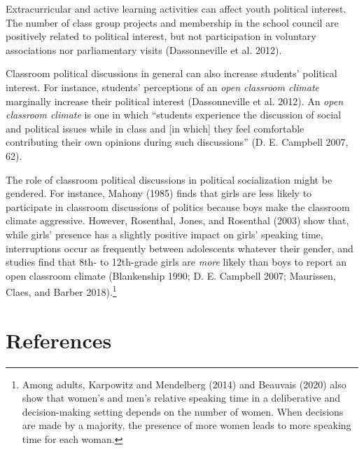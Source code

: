 \documentclass[
  letterpaper,
  DIV=11,
  numbers=noendperiod]{scrreprt}
\begin{document}
Extracurricular and active learning activities can affect youth
political interest. The number of class group projects and membership in
the school council are positively related to political interest, but not
participation in voluntary associations nor parliamentary visits
(Dassonneville et al. 2012).

Classroom political discussions in general can also increase students'
political interest. For instance, students' perceptions of an \emph{open
classroom climate} marginally increase their political interest
(Dassonneville et al. 2012). An \emph{open classroom climate} is one in
which ``students experience the discussion of social and political
issues while in class and {[}in which{]} they feel comfortable
contributing their own opinions during such discussions'' (D. E.
Campbell 2007, 62).

The role of classroom political discussions in political socialization
might be gendered. For instance, Mahony (1985) finds that girls are less
likely to participate in classroom discussions of politics because boys
make the classroom climate aggressive. However, Rosenthal, Jones, and
Rosenthal (2003) show that, while girls' presence has a slightly
positive impact on girls' speaking time, interruptions occur as
frequently between adolescents whatever their gender, and studies find
that 8th- to 12th-grade girls are \emph{more} likely than boys to report
an open classroom climate (Blankenship 1990; D. E. Campbell 2007;
Maurissen, Claes, and Barber 2018).\footnote{Among adults, Karpowitz and
  Mendelberg (2014) and Beauvais (2020) also show that women's and men's
  relative speaking time in a deliberative and decision-making setting
  depends on the number of women. When decisions are made by a majority,
  the presence of more women leads to more speaking time for each woman.}

\hypertarget{references-5}{%
\section{References}\label{references-5}}
\end{document}
